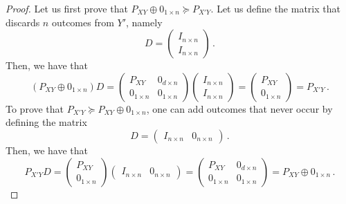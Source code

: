 \documentclass[aps,pra,11pt,onecolumn,nofootinbib,tightenlines]{revtex4-2}
\theoremstyle{definition}
\begin{document}
\begin{proof}
Let us first prove that $P_{XY} \oplus 0_{1 \times n} \succeq P_{X'Y}$. Let us define the matrix that discards $n$ outcomes from $Y'$, namely  
\begin{equation}
    D=\begin{pmatrix}
        I_{n \times n} \\
        I_{n \times n} 
    \end{pmatrix} \,.
\end{equation}
Then, we have that 
\begin{equation}
   (P_{XY} \oplus 0_{1\times n} ) D = \begin{pmatrix}
        P_{XY} & 0_{d \times n}\\
        0_{1 \times n} & 0_{1\times n}
    \end{pmatrix} \begin{pmatrix}
        I_{n \times n} \\
        I_{n \times n} 
    \end{pmatrix} = \begin{pmatrix}
        P_{XY}\\
        0_{1 \times n}
    \end{pmatrix}  = P_{X'Y} \,.
\end{equation}
To prove that $P_{X'Y} \succeq P_{XY} \oplus 0_{1 \times n}$, one can add outcomes that never occur by defining the matrix
\begin{equation}
    D=\begin{pmatrix}
        I_{n \times n} & 0_{n \times n}
    \end{pmatrix} \,.
\end{equation}
Then, we have that 
\begin{equation}
   P_{X'Y} D = \begin{pmatrix}
        P_{XY} \\
        0_{1 \times n} 
    \end{pmatrix} \begin{pmatrix}
        I_{n \times n} & 0_{n \times n}
    \end{pmatrix} = \begin{pmatrix}
        P_{XY} & 0_{d \times n}\\
        0_{1 \times n} & 0_{1 \times n}
    \end{pmatrix}  = P_{XY} \oplus 0_{1\times n} \,.
\end{equation} 
\end{proof}
\end{document}
